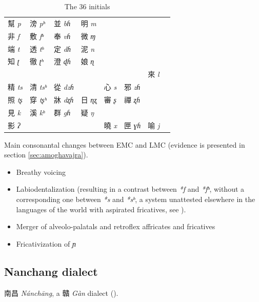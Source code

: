 \documentclass[oneside,a4paper,11pt]{article}
\newcommand{\ipa}[1]{{\phon\textit{#1}}}
\newcommand{\zh}[1]{{\cn #1}}
\newcommand{\zhc}[2]{\zh{#1} \ipa{#2}}
\begin{document}
\begin{table}[H]
\caption{The 36 initials} \centering
\begin{tabular}{llllllll}
\toprule
\zhc{幫}{p} & 	\zhc{滂}{pʰ} & 	\zhc{並}{bɦ} & 	\zhc{明}{m} & 	 & 	 & 	 & 	\\
\zhc{非}{f} & 	\zhc{敷}{fʰ} & 	\zhc{奉}{vɦ} & 	\zhc{微}{ɱ} & 	 & 	 & 	 & 	\\
\zhc{端}{t} & 	\zhc{透}{tʰ} & 	\zhc{定}{dɦ} & 	\zhc{泥}{n} & 	 & 	 & 	 & 	\\
\zhc{知}{ʈ} & 	\zhc{徹}{ʈʰ} & 	\zhc{澄}{ɖɦ} & 	\zhc{娘}{ɳ} & 	 & 	 & 	 & 	\\
 & 	 & 	 & 	 & 	 & 	 & 	\zhc{來}{l} & 	\\
\zhc{精}{ts} & 	\zhc{清}{tsʰ} & 	\zhc{從}{dzɦ} & 	 & 	\zhc{心}{s} & 	\zhc{邪}{zɦ} & 	 & 	\\
\zhc{照}{tʂ} & 	\zhc{穿}{tʂʰ} & 	\zhc{牀}{dʐɦ} & 	\zhc{日}{ɳʐ} & 	\zhc{審}{ʂ} & 	\zhc{禪}{ʐɦ} & 	 & 	\\
\zhc{見}{k} & 	\zhc{溪}{kʰ} & 	\zhc{群}{gɦ} & 	\zhc{疑}{ŋ} & 	 & 	 & 	 & 	\\
\zhc{影}{ʔ} & 	 & 	 & 	 & 	\zhc{曉}{x} & 	\zhc{匣}{ɣɦ} & 	\zhc{喻}{j} & 	\\
\bottomrule
\end{tabular}
\end{table}

Main consonantal changes between EMC and LMC (evidence is presented in section \ref{sec:amoghavajra}).
\begin{itemize}
\item Breathy voicing
\item Labiodentalization (resulting in a contrast between \ipa{*f} and \ipa{*fʰ}, without a corresponding one between \ipa{*s} and \ipa{*sʰ}, a system unattested elsewhere in the languages of the world with aspirated fricatives, see \citealt{jacques11lingua}).
\item Merger of alveolo-palatals and retroflex affricates and fricatives
\item Fricativization of \ipa{ɲ}
\end{itemize}



\subsection{Nanchang dialect}
\zhc{南昌}{Nánchāng}, a \zhc{贛}{Gàn} dialect (\citealt{sagart93gan}).
\end{document}
